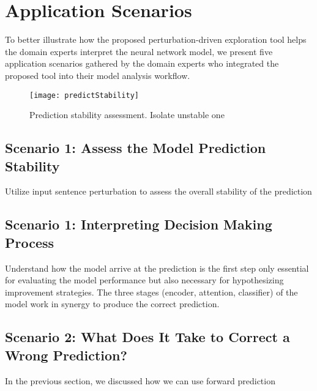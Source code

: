 \section{Application Scenarios}
\label{sec:caseStudy}
To better illustrate how the proposed perturbation-driven exploration tool helps the domain experts interpret the neural network model, we present five application scenarios gathered by the domain experts who integrated the proposed tool into their model analysis workflow.

\begin{figure}[htbp]
\centering
\vspace{-2mm}
 \texttt{[image: predictStability]}
 \caption{
Prediction stability assessment. Isolate unstable one
 }
\label{fig:pipelineView}
\end{figure}

\subsection{Scenario 1: Assess the Model Prediction Stability}
Utilize input sentence perturbation to assess the overall stability of the prediction

\subsection{Scenario 1: Interpreting Decision Making Process}
Understand how the model arrive at the prediction is the first step  only essential for evaluating the model performance but also necessary for hypothesizing improvement strategies.
%
The three stages (encoder, attention, classifier) of the model work in synergy to produce the correct prediction.
%

\subsection{Scenario 2: What Does It Take to Correct a Wrong Prediction?}
In the previous section, we discussed how we can use forward prediction



